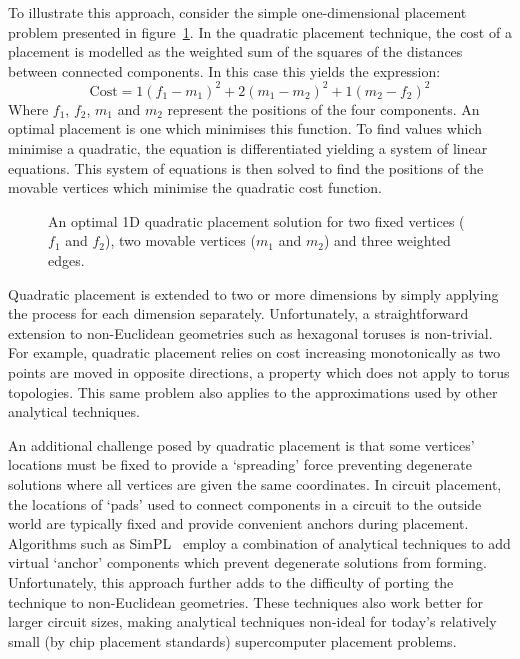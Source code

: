 				To illustrate this approach, consider the simple one-dimensional
				placement problem presented in figure~\ref{fig:quadratic-placement}.
				In the quadratic placement technique, the cost of a placement is
				modelled as the weighted sum of the squares of the distances between
				connected components. In this case this yields the expression:
				\begin{equation*}
					\textrm{Cost} = 1(f_1 - m_1)^2 + 2(m_1 - m_2)^2 + 1(m_2 - f_2)^2
				\end{equation*}
				Where $f_1$, $f_2$, $m_1$ and $m_2$ represent the positions of the four
				components. An optimal placement is one which minimises this function.
				To find values which minimise a quadratic, the equation is
				differentiated yielding a system of linear equations. This system of
				equations is then solved to find the positions of the movable vertices
				which minimise the quadratic cost function.
				
				\begin{figure}
					\center
					
					\caption[An optimal 1D quadratic placement solution.]%
					{An optimal 1D quadratic placement solution for two fixed
					vertices ($f_1$ and $f_2$), two movable vertices ($m_1$ and $m_2$)
					and three weighted edges.}
					\label{fig:quadratic-placement}
				\end{figure}
				
				Quadratic placement is extended to two or more dimensions by simply
				applying the process for each dimension separately. Unfortunately, a
				straightforward extension to non-Euclidean geometries such as
				hexagonal toruses is non-trivial. For example, quadratic placement
				relies on cost increasing monotonically as two points are moved in
				opposite directions, a property which does not apply to torus
				topologies. This same problem also applies to the approximations used
				by other analytical techniques.
				
				An additional challenge posed by quadratic placement is that some
				vertices' locations must be fixed to provide a `spreading' force
				preventing degenerate solutions where all vertices are given the same
				coordinates. In circuit placement, the locations of `pads' used to
				connect components in a circuit to the outside world are typically
				fixed and provide convenient anchors during placement. Algorithms such
				as SimPL~\cite{kim12b} employ a combination of analytical techniques to
				add virtual `anchor' components which prevent degenerate solutions from
				forming. Unfortunately, this approach further adds to the difficulty of
				porting the technique to non-Euclidean geometries. These techniques
				also work better for larger circuit sizes, making analytical techniques
				non-ideal for today's relatively small (by chip placement standards)
				supercomputer placement problems.
				
